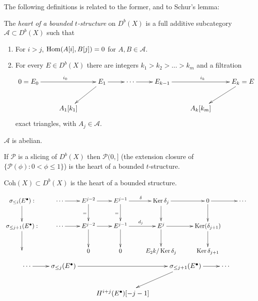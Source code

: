The following definitions is related to the
former, and to Schur's lemma:

\begin{definition}
\label{bsgt-label-001}
The {\it heart of a bounded $t$-structure} on
$D^b(X)$ is a full additive subcategory
$\mathcal{A} \subset D^b(X)$ such that
\begin{enumerate}
\item For $i>j$, $\mathop{\mathrm{Hom}}\nolimits(A[i],B[j])=0$ for $A,B
\in \mathcal{A}$.
\item For every $E \in D^b(X)$ there are
integers $k_1>k_2>\ldots>k_m$ and a
filtration
\begin{equation}
\label{equation-diagram-abelian-category}
\xymatrix{
0=E_0\ar[rr]^{i_0}&&E_1\ar[dl]\ar[r]&
\cdots\ar[r]
&E_{k-1}\ar[rr]^{i_k}&&E_k=E\ar[dl]\\
&A_1[k_1]& & & & A_k[k_m]
}
\end{equation}
exact triangles, with $A_j \in \mathcal{A}$.
\end{enumerate}
\end{definition}

\begin{exercise}
\label{exercise-A-is-abelian}
$\mathcal{A}$ is abelian.
\end{exercise}

\begin{exercise}
\label{exercise-}
If $\mathcal{P}$ is a slicing of $D^b(X)$
then $\mathcal{P}(0,]$ (the extension closure
of $\{\mathcal{P}(\phi):0<\phi \leq 1\}$) is
the heart of a bounded $t$-structure.
\end{exercise}

\begin{example}
\label{bsgt-label-002}
$\text{Coh}(X)\subset D^b(X)$ is the heart of
a bounded structure.

$$
\xymatrix{
\sigma_{\leq i}(E^\bullet):\ar[d]&
\cdots\ar[r]& E^{j-2}\ar[d]_=\ar[r]&
E^{j-1}\ar[d]_=\ar[r]^{\delta}& \Ker
\delta_j\ar[d]\ar[r]&  0 \ar[d]\ar[r]
&  \cdots\\
\sigma_{\leq j+1}(E^\bullet):\ar[d]&  \cdots
\ar[r]& E^{j-2}\ar[d]\ar[r]
& E^{j-1}\ar[d]\ar[r]^{d_j}&E^j\ar[d]\ar[r]&
\Ker(\delta_{j+1})\ar[d]\\
&& 0& 0&E_2k/\Ker \delta_j& \Ker \delta_{j+1}
}
$$
\medskip
$$
\xymatrix{
\cdots\ar[r]&\sigma_{\leq
j}(E^\bullet)\ar[rr]& &\sigma_{\leq
j+1}(E^\bullet)\ar[dl]\ar[r]&  \cdots\\
&  &  H^{i+j}(E^\bullet)[-j-1]
}
$$
\end{example}


